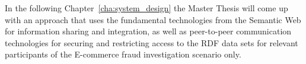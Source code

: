 In the following Chapter~\ref{cha:system_design} the Master Thesis will come up with an approach that uses the fundamental technologies from the Semantic Web for information sharing and integration, as well as peer-to-peer communication technologies for securing and restricting access to the \gls{RDF} data sets for relevant participants of the \gls{E-commerce} fraud investigation scenario only.

